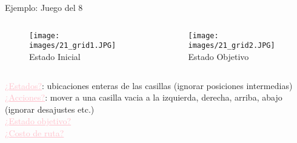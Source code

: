 \begin{frame}{Ejemplo: Juego del 8}
	\begin{columns}
		\begin{column}{0.5\textwidth}		
			\begin{figure}[h!]
				\texttt{[image: images/21\_grid1.JPG]}
				\\
				\vspace{0pt}
				{\tiny Estado Inicial}
			\end{figure}
		\end{column}
		
		\begin{column}{0.5\textwidth}  %
			\begin{figure}
	     		\texttt{[image: images/21\_grid2.JPG]}
	     		\\
				\vspace{0pt}
				{\tiny Estado Objetivo}
			\end{figure}
		\end{column}
	\end{columns}
	\vfill
	\small{	
            \textcolor{Pink}{\underline{¿Estados?}}: ubicaciones enteras de las casillas (ignorar posiciones intermedias)\\
            \textcolor{Pink}{\underline{¿Acciones?}}: mover a una casilla vacia a la izquierda, derecha, arriba, abajo (ignorar desajustes etc.)\\
            \textcolor{Pink}{\underline{¿Estado objetivo?}}\\
            \textcolor{Pink}{\underline{¿Costo de ruta?}}\\
    }
\end{frame}